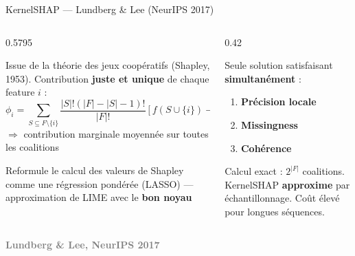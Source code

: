 \documentclass[10pt]{beamer}
\newcommand{\source}[1]{\vspace{6pt}\hfill{\textcolor{gray}{\textbf{\tiny #1}}}}
\begin{document}
\begin{frame}{KernelSHAP --- Lundberg \& Lee (NeurIPS 2017)}
  \begin{columns}
    \begin{column}{0.5795\textwidth}
    \vspace{-0.5cm}
      \begin{tcolorbox}[
        colback=blue!3, colframe=blue!40!black,
        arc=2mm, boxrule=0.5pt, fonttitle=\bfseries,
        title={La valeur de Shapley}]
        Issue de la théorie des jeux coopératifs (Shapley, 1953).
        Contribution \textbf{juste et unique} de chaque feature $i$ :
       {\footnotesize
       	\[
          \phi_i = \sum_{S \subseteq F \setminus \{i\}} \frac{|S|!(|F|-|S|-1)!}{|F|!}
          \left[f(S \cup \{i\}) - f(S)\right]
        \]}
        $\Rightarrow$ contribution marginale moyennée sur toutes les coalitions
      \end{tcolorbox}
      \begin{tcolorbox}[
        colback=orange!3, colframe=orange!50!black,
        arc=2mm, boxrule=0.5pt, fonttitle=\bfseries,
        title={KernelSHAP}]
        Reformule le calcul des valeurs de Shapley comme une régression
        pondérée (LASSO) --- approximation de LIME avec le \textbf{bon noyau}
      \end{tcolorbox}
    \end{column}
    \begin{column}{0.42\textwidth}
    	\vspace{-0.7cm}
      \begin{tcolorbox}[
        colback=green!3, colframe=green!40!black,
        arc=2mm, boxrule=0.5pt, fonttitle=\bfseries,
        title={SHAP unifie LIME, DeepLIFT, SHAP linéaire\ldots}]
        Seule solution satisfaisant \textbf{simultanément} :
        \begin{enumerate}
          \item \textbf{Précision locale}
          \item \textbf{Missingness}
          \item \textbf{Cohérence}
        \end{enumerate}
      \end{tcolorbox}
      \begin{tcolorbox}[
        colback=red!3, colframe=red!60!black,
        arc=2mm, boxrule=0.5pt, fonttitle=\bfseries,
        title={Limite}]
        {\small
        Calcul exact : $2^{|F|}$ coalitions.\\
        KernelSHAP \textbf{approxime} par échantillonnage.
        Coût élevé pour longues séquences.}
      \end{tcolorbox}
    \end{column}
  \end{columns}
  \source{Lundberg \& Lee, NeurIPS 2017}
\end{frame}
\end{document}
